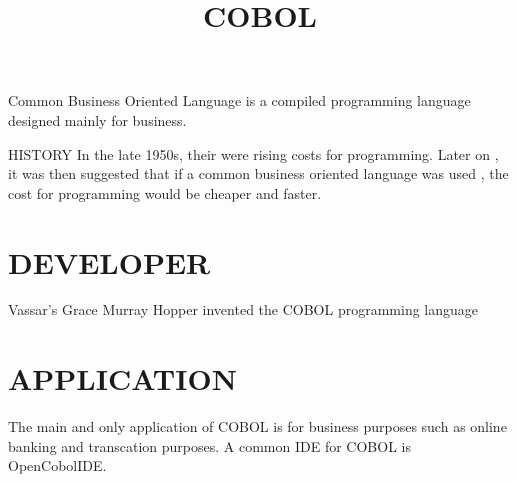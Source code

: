 \documentclass{article}
\title{COBOL}
\begin{document}
	\maketitle
	Common Business Oriented Language is a compiled programming language designed mainly for business.
	
	HISTORY
	In the late 1950s, their were rising costs for programming. Later on , it was then suggested that if a common business oriented language was used , the cost for programming would be cheaper and faster. 
	
	\section{DEVELOPER}
	Vassar’s Grace Murray Hopper invented the COBOL programming language  
	
	\section{APPLICATION}
	The main and only application of COBOL is for business purposes such as online banking and transcation purposes.
	A common IDE for COBOL is OpenCobolIDE.
	
\end{document}
